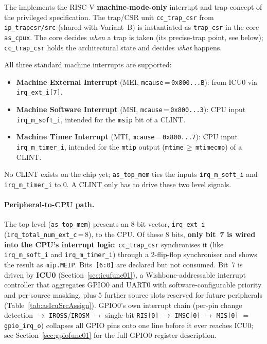 The \aschip{} implements the RISC-V \textbf{machine-mode-only} interrupt and
trap concept of the privileged specification. The trap/CSR unit
\texttt{cc\_trap\_csr} from \texttt{ip\_trapcsr/src} (shared with Variant~B)
is instantiated as \texttt{trap\_csr} in the core \texttt{as\_cpux}. The core decides \emph{when} a trap is
taken (its precise-trap point, see below); \texttt{cc\_trap\_csr} holds the
architectural state and decides \emph{what} happens.

All three standard machine interrupts are supported:
\begin{itemize}
  \item \textbf{Machine External Interrupt} (MEI, \texttt{mcause}\,=\,\texttt{0x800...B}):
    from ICU0 via \texttt{irq\_ext\_i[7]}.
  \item \textbf{Machine Software Interrupt} (MSI, \texttt{mcause}\,=\,\texttt{0x800...3}):
    CPU input \texttt{irq\_m\_soft\_i}, intended for the \texttt{msip} bit of
    a CLINT.
  \item \textbf{Machine Timer Interrupt} (MTI, \texttt{mcause}\,=\,\texttt{0x800...7}):
    CPU input \texttt{irq\_m\_timer\_i}, intended for the \texttt{mtip}
    output (\texttt{mtime}\,$\geq$\,\texttt{mtimecmp}) of a CLINT.
\end{itemize}
No CLINT exists on the chip yet; \texttt{as\_top\_mem}
ties the inputs \texttt{irq\_m\_soft\_i} and \texttt{irq\_m\_timer\_i} to 0.
A CLINT only has to drive these two level signals.

\paragraph{Peripheral-to-CPU path.}
The top level (\texttt{as\_top\_mem}) presents an 8-bit vector,
\texttt{irq\_ext\_i} (\texttt{irq\_total\_num\_ext\_c}\,=\,8), to the CPU.
Of these 8 bits, \textbf{only bit~7 is wired into the CPU's interrupt
logic}: \texttt{cc\_trap\_csr} synchronises it (like
\texttt{irq\_m\_soft\_i} and \texttt{irq\_m\_timer\_i}) through a
2-flip-flop synchroniser and shows the result as \texttt{mip.MEIP}.
Bits~\texttt{[6:0]} are declared but not consumed.
Bit~7 is driven by \textbf{ICU0} (Section~\ref{sec:icufunc01}), a
Wishbone-addressable interrupt controller that aggregates GPIO0 and UART0 with software-configurable
priority and per-source masking, plus 5 further source slots reserved for
future peripherals (Table~\ref{tab:asIcuSrcAssign}). GPIO0's own interrupt
chain (per-pin change detection $\rightarrow$ \texttt{IRQSS}/\texttt{IRQSM}
$\rightarrow$ single-bit \texttt{RIS[0]} $\rightarrow$ \texttt{IMSC[0]}
$\rightarrow$ \texttt{MIS[0]} $=$ \texttt{gpio\_irq\_o}) collapses all GPIO
pins onto one line before it ever reaches ICU0; see
Section~\ref{sec:gpiofunc01} for the full GPIO0 register description.

